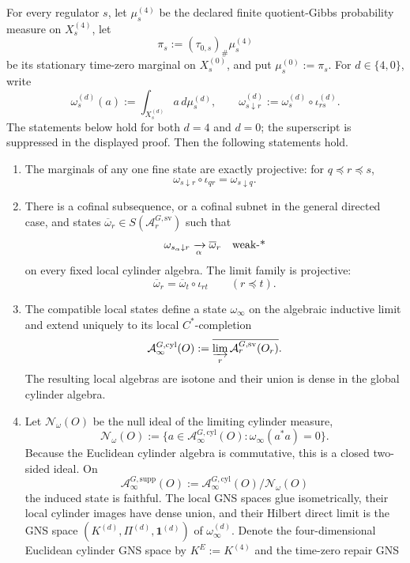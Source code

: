 \begin{proposition}
\label{prop:compact-gauge-extraction-yang-mills}
For every regulator \(s\), let \(\mu_s^{(4)}\) be the declared finite quotient-Gibbs probability
measure on \(X_s^{(4)}\), let
\[
\pi_s:=(\tau_{0,s})_\#\mu_s^{(4)}
\]
be its stationary time-zero marginal on \(X_s^{(0)}\), and put
\(\mu_s^{(0)}:=\pi_s\). For \(d\in\{4,0\}\), write
\[
\omega_s^{(d)}(a):=\int_{X_s^{(d)}}a\,d\mu_s^{(d)},
\qquad
\omega_{s\downarrow r}^{(d)}
:=\omega_s^{(d)}\circ\iota_{rs}^{(d)}.
\]
The statements below hold for both \(d=4\) and \(d=0\); the superscript is suppressed in the
displayed proof.
Then the following statements hold.
\begin{enumerate}[label=\textup{(\roman*)},leftmargin=2em]
\item The marginals of any one fine state are exactly projective: for
\(q\preceq r\preceq s\),
\[
\omega_{s\downarrow r}\circ\iota_{qr}=\omega_{s\downarrow q}.
\]
\item There is a cofinal subsequence, or a cofinal subnet in the general directed case, and states
\(\overline\omega_r\in S(\mathcal A_r^{G,\mathrm{sv}})\) such that
\[
\omega_{s_\alpha\downarrow r}\xrightarrow[\alpha]{}\overline\omega_r
\quad\hbox{weak-*}
\]
on every fixed local cylinder algebra. The limit family is projective:
\[
\overline\omega_r=\overline\omega_t\circ\iota_{rt}
\qquad(r\preceq t).
\]
\item The compatible local states define a state \(\omega_\infty\) on the algebraic inductive
limit and extend uniquely to its local \(C^*\)-completion
\[
\mathcal A_\infty^{G,\mathrm{cyl}}(O)
:=\overline{\varinjlim_r\mathcal A_r^{G,\mathrm{sv}}(O_r)}.
\]
The resulting local algebras are isotone and their union is dense in the global cylinder algebra.
\item Let \(\mathcal N_\omega(O)\) be the null ideal of the limiting cylinder measure,
\[
\mathcal N_\omega(O)
:=\{a\in\mathcal A_\infty^{G,\mathrm{cyl}}(O):
\omega_\infty(a^*a)=0\}.
\]
Because the Euclidean cylinder algebra is commutative, this is a closed two-sided ideal. On
\[
\mathcal A_\infty^{G,\mathrm{supp}}(O)
:=\mathcal A_\infty^{G,\mathrm{cyl}}(O)/\mathcal N_\omega(O)
\]
the induced state is faithful. The local GNS spaces glue isometrically, their local cylinder
images have dense union, and their Hilbert direct limit is the GNS space
\((K^{(d)},\Pi^{(d)},\mathbf 1^{(d)})\) of \(\omega_\infty^{(d)}\). Denote the
four-dimensional Euclidean cylinder GNS space by \(K^E:=K^{(4)}\) and the time-zero repair GNS

\end{enumerate}
\end{proposition}
